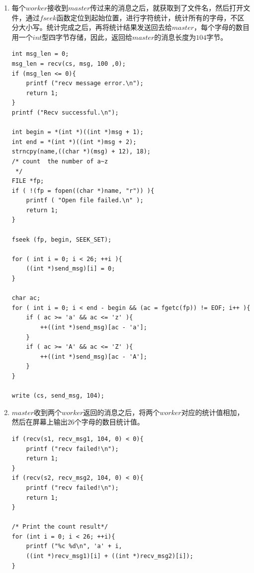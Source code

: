 \documentclass[UTF8,noindent]{ctexart}
\begin{document}
\begin{enumerate}
\begin{lstlisting}
char loc[] = {'w', 'a','r','_','a','n','d',
    '_','p','e','a','c','e','.','t','x','t','\0'};
void *message1 = malloc (30);
void *message2 = malloc (30);
memcpy((void *)message1, &total, 4);
memcpy((void *)((int *)(message1) + 1), &zero, 4);
memcpy((void *)((int *)(message1) + 2), &middle, 4);
strncpy(((char *)message1 + 12), loc, 18);
memcpy((void *)message2, &total, 4);
memcpy((void *)((int *)(message2) + 1), &middle, 4);
memcpy((void *)((int *)(message2) + 2), &numOfChar, 4);
strncpy(((char *)message2 + 12), loc, 18);

//send work to workers
if ( send(s1, message1, 30, 0) < 0 ){
	printf ( "Send to worker1 failed!\n" );
	return 1;
}
if ( send(s2, message2, 30, 0) < 0 ){
	printf ( "Send to worker2 failed!\n" );
	return 1;
}
\end{lstlisting}


\item 每个$worker$接收到$master$传过来的消息之后，就获取到了文件名，然后打开文件，通过$fseek$函数定位到起始位置，进行字符统计，统计所有的字母，不区分大小写。统计完成之后，再将统计结果发送回去给$master$，每个字母的数目用一个$int$型四字节存储，因此，返回给$master$的消息长度为$104$字节。
\begin{lstlisting}
int msg_len = 0;
msg_len = recv(cs, msg, 100 ,0);
if (msg_len <= 0){
	printf ("recv message error.\n");
	return 1;
}
printf ("Recv successful.\n");

int begin = *(int *)((int *)msg + 1);
int end = *(int *)((int *)msg + 2);
strncpy(name,((char *)(msg) + 12), 18);
/* count  the number of a~z
 */
FILE *fp;
if ( !(fp = fopen((char *)name, "r")) ){
	printf ( "Open file failed.\n" );
	return 1;
}

fseek (fp, begin, SEEK_SET);

for ( int i = 0; i < 26; ++i ){
	((int *)send_msg)[i] = 0;
}

char ac;
for ( int i = 0; i < end - begin && (ac = fgetc(fp)) != EOF; i++ ){
	if ( ac >= 'a' && ac <= 'z' ){
		++((int *)send_msg)[ac - 'a'];
	}
	if ( ac >= 'A' && ac <= 'Z' ){
		++((int *)send_msg)[ac - 'A'];
	}
}

write (cs, send_msg, 104);
\end{lstlisting}


\item $master$收到两个$worker$返回的消息之后，将两个$worker$对应的统计值相加，然后在屏幕上输出$26$个字母的数目统计值。
\begin{lstlisting}
if (recv(s1, recv_msg1, 104, 0) < 0){
	printf ("recv failed!\n");
	return 1;
}
if (recv(s2, recv_msg2, 104, 0) < 0){
	printf ("recv failed!\n");
	return 1;
}

/* Print the count result*/
for (int i = 0; i < 26; ++i){
	printf ("%c %d\n", 'a' + i, 
	((int *)recv_msg1)[i] + ((int *)recv_msg2)[i]);
}
\end{lstlisting}
\end{enumerate}
\end{document}
